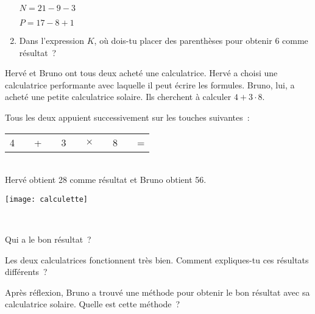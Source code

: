 \begin{activite}
\begin{partie}
\begin{enumerate}
$N = 21 - 9 - 3$ \dotfill

$P = 17 - 8 + 1$ \dotfill

 \item Dans l'expression $K$, où dois-tu placer des parenthèses pour obtenir 6 comme résultat ?

\dotfill
 \end{enumerate}
\end{partie}

\end{activite}


\begin{activite}

 \begin{minipage}{0.6\textwidth}
Hervé et Bruno ont tous deux acheté une calculatrice. Hervé a choisi une calculatrice performante avec laquelle il peut écrire les formules. Bruno, lui, a acheté une petite calculatrice solaire. Ils cherchent à calculer $4 + 3 \cdot 8$.

Tous les deux appuient successivement sur les touches suivantes :  \\[0.5em]
\begin{tabular}{|c|c|c|c|c|c|c|c|c|c|c|}
\cline{1-1} \cline{3-3}\cline{5-5} \cline{7-7}\cline{9-9} \cline{11-11}
4 & & + & & 3 & & $\times$ & & 8 & & = \\ \cline{1-1} \cline{3-3}\cline{5-5} \cline{7-7}\cline{9-9} \cline{11-11}
\end{tabular} \\[0.5em]
Hervé obtient 28 comme résultat et Bruno obtient 56.
 \end{minipage} \hfill%
  \begin{minipage}{0.2\textwidth}
   \texttt{[image: calculette]}
   \end{minipage}\\

\begin{partie}
Qui a le bon résultat ?
\end{partie}

\begin{partie}
Les deux calculatrices fonctionnent très bien. Comment expliques-tu ces résultats différents ?
\end{partie}

\begin{partie}
Après réflexion, Bruno a trouvé une méthode pour obtenir le bon résultat avec sa calculatrice solaire. Quelle est cette méthode ?
\end{partie}

\end{activite}

